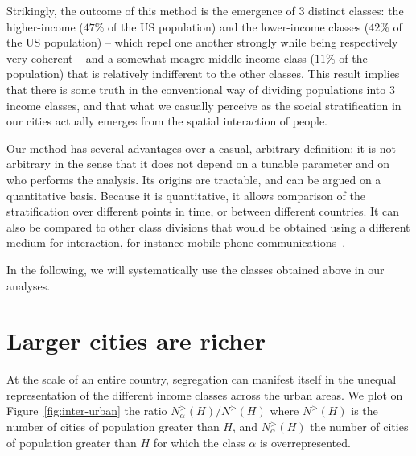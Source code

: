 Strikingly, the outcome of this method is the emergence of 3 distinct classes:
the higher-income ($47\%$ of the US population) and the lower-income classes
($42\%$ of the US population) -- which repel one another strongly while being
respectively very coherent -- and a somewhat meagre middle-income class ($11\%$
of the population) that is relatively indifferent to the other classes. This
result implies that there is some truth in the conventional way of dividing
populations into $3$ income classes, and that what we casually perceive as the
social stratification in our cities actually emerges from the spatial
interaction of people. 

Our method has several advantages over a casual, arbitrary definition: it is not
arbitrary in the sense that it does not depend on a tunable parameter and on who
performs the analysis. Its origins are tractable, and can be argued on a
quantitative basis. Because it is quantitative, it allows comparison of the
stratification over different points in time, or between different countries. It
can also be compared to other class divisions that would be obtained using a
different medium for interaction, for instance mobile phone
communications~\cite{Eagle:2010}. 

In the following, we will systematically use the classes obtained above in our
analyses.



\section{Larger cities are richer}
\label{sec:inter_urban}

At the scale of an entire country, segregation can manifest itself in the
unequal representation of the different income classes across the urban areas.
We plot on Figure~\ref{fig:inter-urban} the ratio $
N_\alpha^{>}(H)/N^{>}(H)$ where $N^{>}(H)$ is the number of cities of
population greater than $H$, and $N_\alpha^{>}(H)$ the number of cities of
population greater than $H$ for which the class $\alpha$ is overrepresented.

